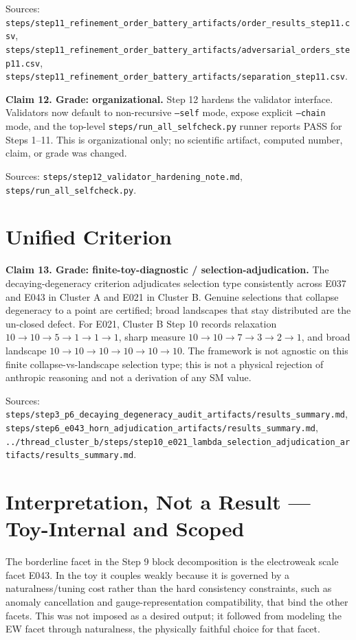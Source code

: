 \documentclass[11pt]{article}
\begin{document}
Sources: \texttt{steps/step11\_refinement\_order\_battery\_artifacts/order\_results\_step11.csv}, \texttt{steps/step11\_refinement\_order\_battery\_artifacts/adversarial\_orders\_step11.csv}, \texttt{steps/step11\_refinement\_order\_battery\_artifacts/separation\_step11.csv}.

\textbf{Claim 12. Grade: organizational.}
Step 12 hardens the validator interface. Validators now default to non-recursive \texttt{--self} mode, expose explicit \texttt{--chain} mode, and the top-level \texttt{steps/run\_all\_selfcheck.py} runner reports PASS for Steps 1--11. This is organizational only; no scientific artifact, computed number, claim, or grade was changed.

Sources: \texttt{steps/step12\_validator\_hardening\_note.md}, \texttt{steps/run\_all\_selfcheck.py}.

\section{Unified Criterion}

\textbf{Claim 13. Grade: finite-toy-diagnostic / selection-adjudication.}
The decaying-degeneracy criterion adjudicates selection type consistently across E037 and E043 in Cluster A and E021 in Cluster B. Genuine selections that collapse degeneracy to a point are certified; broad landscapes that stay distributed are the un-closed defect. For E021, Cluster B Step 10 records relaxation \(10\to10\to5\to1\to1\to1\), sharp measure \(10\to10\to7\to3\to2\to1\), and broad landscape \(10\to10\to10\to10\to10\to10\). The framework is not agnostic on this finite collapse-vs-landscape selection type; this is not a physical rejection of anthropic reasoning and not a derivation of any SM value.

Sources: \texttt{steps/step3\_p6\_decaying\_degeneracy\_audit\_artifacts/results\_summary.md}, \texttt{steps/step6\_e043\_horn\_adjudication\_artifacts/results\_summary.md}, \texttt{../thread\_cluster\_b/steps/step10\_e021\_lambda\_selection\_adjudication\_artifacts/results\_summary.md}.

\section{Interpretation, Not a Result --- Toy-Internal and Scoped}

The borderline facet in the Step 9 block decomposition is the electroweak scale facet E043. In the toy it couples weakly because it is governed by a naturalness/tuning cost rather than the hard consistency constraints, such as anomaly cancellation and gauge-representation compatibility, that bind the other facets. This was not imposed as a desired output; it followed from modeling the EW facet through naturalness, the physically faithful choice for that facet.
\end{document}
